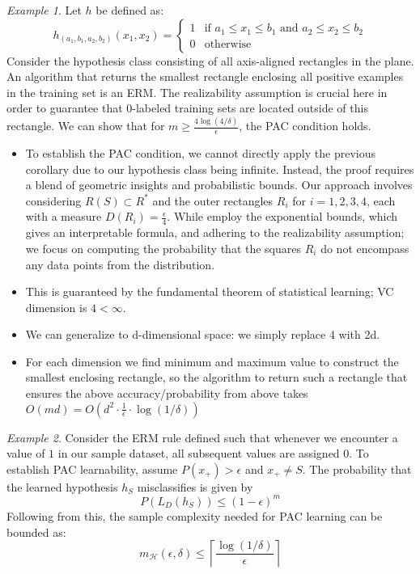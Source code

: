 \documentclass{article}
\theoremstyle{remark}
\newtheorem{example}{Example}
\begin{document}
\begin{example}
    Let \( h \) be defined as:
    \[
    h_{(a_1, b_1, a_2, b_2)}(x_1, x_2) = 
    \begin{cases} 
    1 & \text{if } a_1 \leq x_1 \leq b_1 \text{ and } a_2 \leq x_2 \leq b_2 \\
    0 & \text{otherwise}
    \end{cases}
    \]
    Consider the hypothesis class consisting of all axis-aligned rectangles in the plane.
    An algorithm that returns the smallest rectangle enclosing all positive examples in the training set is an ERM. 
    The realizability assumption is crucial here in order to guarantee that 0-labeled training sets are located outside of this rectangle. We can show that for $m\geq \frac{4\log(4/\delta)}\epsilon$, the PAC condition holds. 
    \begin{itemize}
    \item To establish the PAC condition, we cannot directly apply the previous corollary due to our hypothesis class being infinite. Instead, the proof requires a blend of geometric insights and probabilistic bounds. Our approach involves considering \( R(S) \subset R^* \) and the outer rectangles \( R_i \) for \( i = 1, 2, 3, 4 \), each with a measure \( D(R_i) = \frac{\epsilon}{4} \). While employ the exponential bounds, which gives an interpretable formula, and adhering to the realizability assumption; we focus on computing the probability that the squares \( R_i \) do not encompass any data points from the distribution.
    \item This is guaranteed by the fundamental theorem of statistical learning; VC dimension is $4<\infty$.
    \item We can generalize to d-dimensional space: we simply replace 4 with 2d.
    \item For each dimension we find minimum and maximum value to construct the smallest enclosing rectangle, so the algorithm to return such a rectangle that ensures the above accuracy/probability 
    from above takes $O(md)=O(d^2\cdot\frac 1\epsilon\cdot \log(1/\delta))$
    \end{itemize}
\end{example}
\begin{example}
    Consider the ERM rule defined such that whenever we encounter a value of \(1\) in our sample dataset, all subsequent values are assigned \(0\). To establish PAC learnability, assume \(P(x_+) > \epsilon\) and \(x_+ \neq S\). The probability that the learned hypothesis \(h_S\) misclassifies is given by 
    \[ P(L_D(h_S)) \leq (1-\epsilon)^m \]
    Following from this, the sample complexity needed for PAC learning can be bounded as:
    \[ m_\mathcal{H}(\epsilon, \delta) \leq \left\lceil \frac{\log (1/\delta)}{\epsilon} \right\rceil \]
    \end{example}
\end{document}
